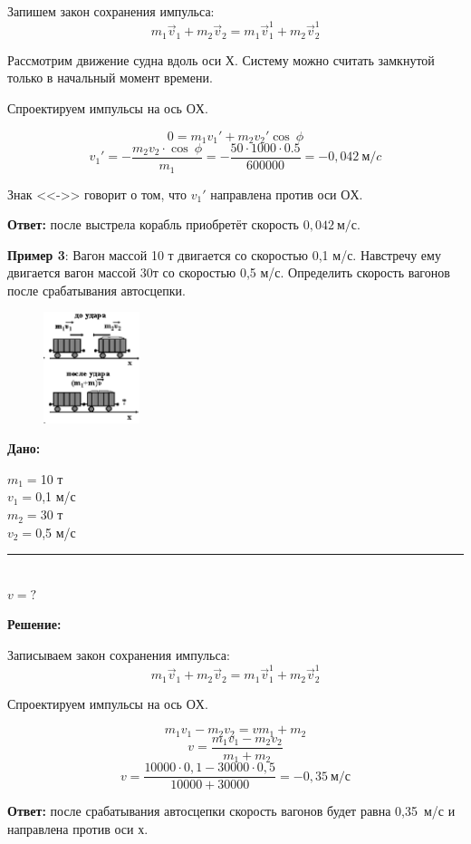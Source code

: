 \documentclass[a6paper, 11pt]{diss_4}
\renewcommand{\'}{\,'}
\begin{document}
  Запишем закон сохранения импульса:
\[
m_1\vec{v}_1+m_2\vec{v}_2=m_1\vec{v}_1^1+m_2\vec{v}_2^1
\]


  Рассмотрим движение судна вдоль оси $Х$. Систему можно считать замкнутой
только в начальный момент времени.

  Спроектируем импульсы на ось $ОХ$.

\[
0=m_1 v_1'+m_2 v_2' \cos\ \phi
\]
\[
v_1'=-\frac{m_2 v_2\cdot \cos\ \phi}{m_1}=-\frac{50\cdot1000\cdot0.5}{600000}=
-0,042\ м/c
\]


Знак <<->> говорит о том, что $v_1'$ направлена против  оси $ОХ$.

\textbf{Ответ:} после выстрела корабль приобретёт скорость $0,042\ м/с$.


  \textbf{Пример 3}: Вагон массой 10 т двигается со скоростью 0,1 м/с.
Навстречу ему двигается вагон массой 30т со скоростью 0,5 м/с. Определить
скорость вагонов после срабатывания автосцепки.


\begin{figure}
\includegraphics[width=0.25\textwidth]{img/img_29.eps}
\label{r29}
\end{figure}
\hspace{1cm}\textbf{Дано:}\hspace{.3cm}
\parbox[t]{4cm}{
$m_1=$10 т\\
$v_1=$0,1 м/с\\
$m_2=$30 т\\
$v_2=$0,5 м/с\\
\rule{4cm}{.4pt}\\
$v=?$\\
}

  \textbf{Решение:}

  Записываем закон сохранения импульса:
\[
m_1\vec{v}_1+m_2\vec{v}_2=m_1\vec{v}_1^1+m_2\vec{v}_2^1
\]

  Спроектируем импульсы на ось $ОХ$.

\[
m_1v_1-m_2v_2=v{m_1+m_2}
\]
\[
v=\frac{m_1v_1-m_2v_2}{m_1+m_2}
\]
\[
v=\frac{10000\cdot0,1-30000\cdot0,5}{10000+30000}=-0,35\ м/с
\]

 \textbf{Ответ:} после срабатывания автосцепки скорость вагонов будет равна
0,35\ м/с и направлена против оси $х$.
\end{document}
